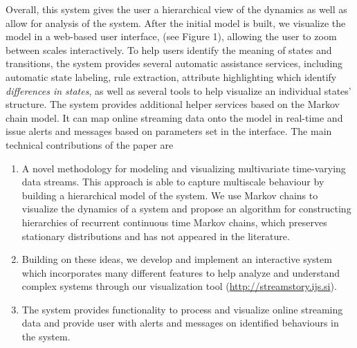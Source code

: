 Overall, this system gives the user a hierarchical view of the dynamics as well as 
allow for analysis of the system. After the initial model is built, we visualize the model
in a web-based user interface, (see Figure 1), allowing the 
user to zoom between scales interactively. To help users identify the
meaning of states and transitions, the system provides several automatic assistance services,
including automatic state labeling, rule extraction, attribute highlighting which
identify \emph{differences in states}, as well as several tools to help visualize an individual states'
structure. 
%
The system provides additional helper  services based on the Markov chain model. It can map online streaming data onto 
the model in real-time and issue alerts and messages based on parameters set in the interface. %
%
The main technical contributions of the paper are
\begin{enumerate}{}
  \item A novel methodology for modeling and visualizing multivariate time-varying data streams. This approach is able to capture multiscale behaviour by building a hierarchical model of the system. We use Markov chains to visualize the dynamics of a system and propose an algorithm for constructing hierarchies of recurrent continuous time Markov chains, which preserves stationary distributions and has not appeared in the literature. %
  \item Building on these ideas, we develop and implement an interactive system which incorporates many different features to help analyze and understand complex systems through our visualization tool (\url{http://streamstory.ijs.si}).
  \item The system provides functionality to process and visualize online streaming data and provide  user with  alerts and messages on identified behaviours in the system.  
\end{enumerate}


